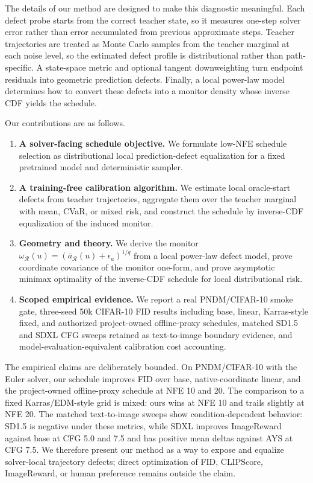 The details of our method are designed to make this diagnostic meaningful. Each
defect probe starts from the correct teacher state, so it measures one-step
solver error rather than error accumulated from previous approximate steps.
Teacher trajectories are treated as Monte Carlo samples from the teacher
marginal at each noise level, so the estimated defect profile is
distributional rather than path-specific. A state-space metric and optional
tangent downweighting turn endpoint residuals into geometric prediction
defects. Finally, a local power-law model determines how to convert these
defects into a monitor density whose inverse CDF yields the schedule.

Our contributions are as follows.
\begin{enumerate}
  \item \textbf{A solver-facing schedule objective.} We formulate low-NFE
  schedule selection as distributional local prediction-defect equalization for
  a fixed pretrained model and deterministic sampler.
  \item \textbf{A training-free calibration algorithm.} We estimate local
  oracle-start defects from teacher trajectories, aggregate them over the
  teacher marginal with mean, CVaR, or mixed risk, and construct the schedule
  by inverse-CDF equalization of the induced monitor.
  \item \textbf{Geometry and theory.} We derive the monitor
  $\omega_{\mathcal R}(u)=(\bar a_{\mathcal R}(u)+\epsilon_a)^{1/q}$ from a
  local power-law defect model, prove coordinate covariance of the monitor
  one-form, and prove asymptotic minimax optimality of the inverse-CDF schedule
  for local distributional risk.
  \item \textbf{Scoped empirical evidence.} We report a real PNDM/CIFAR-10
  smoke gate, three-seed 50k CIFAR-10 FID results including base, linear,
  Karras-style fixed, and authorized project-owned offline-proxy schedules,
  matched SD1.5 and SDXL CFG sweeps retained as text-to-image boundary
  evidence, and model-evaluation-equivalent calibration cost accounting.
\end{enumerate}

The empirical claims are deliberately bounded. On PNDM/CIFAR-10 with the Euler
solver, our schedule improves FID over base, native-coordinate linear, and the
project-owned offline-proxy schedule at NFE 10 and 20. The comparison to a
fixed Karras/EDM-style grid is mixed: ours wins at NFE 10 and trails
slightly at NFE 20. The matched text-to-image sweeps show condition-dependent
behavior: SD1.5 is negative under these metrics, while SDXL improves
ImageReward against base at CFG 5.0 and 7.5 and has positive mean deltas
against AYS at CFG 7.5. We therefore present our method as a way to expose and
equalize solver-local
trajectory defects; direct optimization of FID, CLIPScore, ImageReward, or
human preference remains outside the claim.
